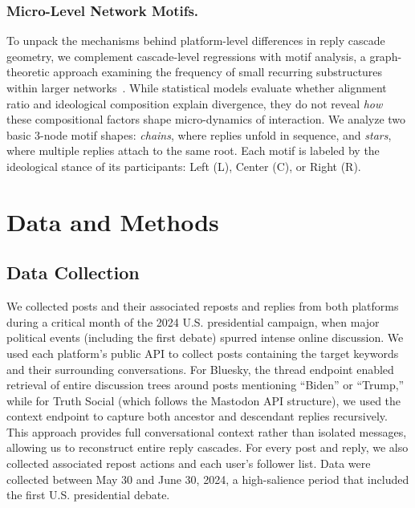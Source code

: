 \documentclass[letterpaper]{article} %
\begin{document}
\subsubsection{Micro-Level Network Motifs.}
To unpack the mechanisms behind platform-level differences in reply cascade geometry, we complement cascade-level regressions with motif analysis, a graph-theoretic approach examining the frequency of small recurring substructures within larger networks~\cite{alon_network_2007}. While statistical models evaluate whether alignment ratio and ideological composition explain divergence, they do not reveal \textit{how} these compositional factors shape micro-dynamics of interaction. We analyze two basic 3-node motif shapes: \textit{chains}, where replies unfold in sequence, and \textit{stars}, where multiple replies attach to the same root. Each motif is labeled by the ideological stance of its participants: Left (L), Center (C), or Right (R).


\section{Data and Methods}

\subsection{Data Collection}
We collected posts and their associated reposts and replies from both platforms during a critical month of the 2024 U.S. presidential campaign, when major political events (including the first debate) spurred intense online discussion. We used each platform's public API to collect posts containing the target keywords and their surrounding conversations. For Bluesky, the thread endpoint enabled retrieval of entire discussion trees around posts mentioning ``Biden'' or ``Trump,'' while for Truth Social (which follows the Mastodon API structure), we used the context endpoint to capture both ancestor and descendant replies recursively. This approach provides full conversational context rather than isolated messages, allowing us to reconstruct entire reply cascades. For every post and reply, we also collected associated repost actions and each user's follower list. Data were collected between May 30 and June 30, 2024, a high-salience period that included the first U.S. presidential debate.
\end{document}
